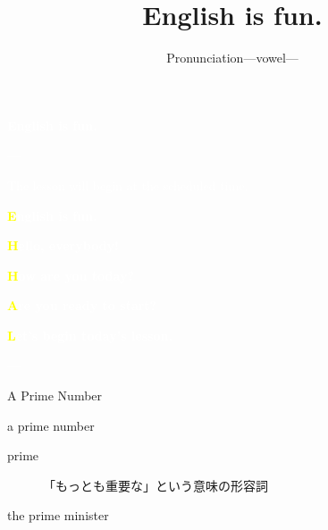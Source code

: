 \documentclass[aspectratio=169,xcolor={dvipsnames,table}]{beamer}
\title{English is fun.}
\subtitle{Pronunciation---vowel---}
\author{}
\institute[]{}
\date[]
\makeatletter
\newcommand*{\themonth}{\two@digits\month}
\newcommand*{\theday}{\two@digits\day}
\newcommand{\mytoday}{{\the\year}--{\themonth}--{\theday}}
\makeatother
\begin{document}
\begin{frame}
\raggedleft
  \textcolor{white}{\Huge\bfseries English is fun.}

\vfill

\raggedleft
 \textcolor{white}{\LARGE\bfseries \mytoday}

\vfill
\vfill
\vfill

\raggedleft
\textcolor{white}{\large The lesson will begin at the scheduled time.}

\end{frame}
\begin{frame}
\raggedleft
  \textcolor{white}{\Huge\bfseries \textcolor{yellow}{E}nglish is fun.}

\vfill

\vfill

\raggedleft
 \textcolor{white}{\LARGE\bfseries \textcolor{yellow}{H}ello, everybody!}

 \textcolor{white}{\LARGE\bfseries \textcolor{yellow}{H}ow are you today?}

\raggedleft
 \textcolor{white}{\LARGE\bfseries \textcolor{yellow}{A}re you ready to start?}

 \textcolor{white}{\LARGE\bfseries \textcolor{yellow}{L}et's begin today's lesson.}

\vfill

\raggedleft
 \textcolor{white}{\Large \bfseries \mytoday}



\hyperlink{today}{}%
\end{frame}
\begin{frame}[plain]{A Prime Number}
\Large
\pause

 a prime number

\pause
\begin{description}
 \item[prime] 「もっとも重要な」という意味の形容詞
\end{description}

\pause

\bigskip
\hfill{}the prime minister
\vfill
\hyperlink{today}{}

\end{frame}
\end{document}
